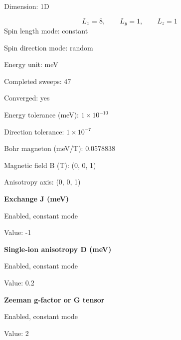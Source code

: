 \documentclass[12pt,a4paper]{article}
\numberwithin{equation}{section}
\numberwithin{figure}{section}
\numberwithin{table}{section}
\begin{document}
	
Dimension: 1D\par
\[
L_x = 8,\qquad L_y = 1,\qquad L_z = 1
\]
Spin length mode: constant\par
Spin direction mode: random\par
Energy unit: meV\par
Completed sweeps: 47\par
Converged: yes\par
Energy tolerance (meV): $1\times 10^{-10}$\par
Direction tolerance: $1\times 10^{-7}$\par
Bohr magneton (meV/T): 0.0578838\par
Magnetic field B (T): (0, 0, 1)\par
Anisotropy axis: (0, 0, 1)\par

\par\medskip\noindent\textbf{Exchange J (meV)}\par
Enabled, constant mode\par
Value: -1\par

\par\medskip\noindent\textbf{Single-ion anisotropy D (meV)}\par
Enabled, constant mode\par
Value: 0.2\par

\par\medskip\noindent\textbf{Zeeman g-factor or G tensor}\par
Enabled, constant mode\par
Value: 2\par
	
	\clearpage
	
\end{document}
